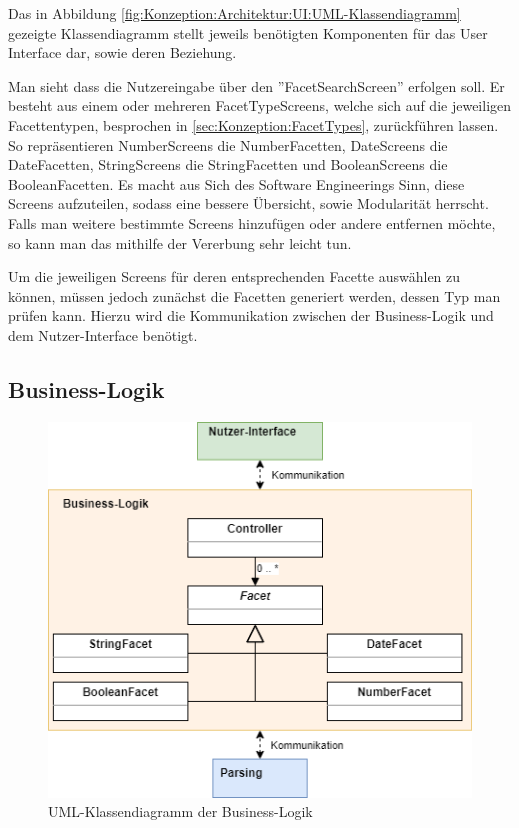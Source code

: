     Das in Abbildung \ref{fig:Konzeption:Architektur:UI:UML-Klassendiagramm} gezeigte Klassendiagramm stellt jeweils benötigten Komponenten für das User Interface dar, sowie deren Beziehung.

    Man sieht dass die Nutzereingabe über den ''FacetSearchScreen'' erfolgen soll.
    Er besteht aus einem oder mehreren FacetTypeScreens, welche sich auf die jeweiligen Facettentypen, besprochen in \ref{sec:Konzeption:FacetTypes}, zurückführen lassen.
    So repräsentieren NumberScreens die NumberFacetten, DateScreens die DateFacetten, StringScreens die StringFacetten und BooleanScreens die BooleanFacetten.
    Es macht aus Sich des Software Engineerings Sinn, diese Screens aufzuteilen, sodass eine bessere Übersicht, sowie Modularität herrscht.
    Falls man weitere bestimmte Screens hinzufügen oder andere entfernen möchte, so kann man das mithilfe der Vererbung sehr leicht tun.

    Um die jeweiligen Screens für deren entsprechenden Facette auswählen zu können, müssen jedoch zunächst die Facetten generiert werden, dessen Typ man prüfen kann.
    Hierzu wird die Kommunikation zwischen der Business-Logik und dem Nutzer-Interface benötigt.

    \subsection{Business-Logik}
    \label{subsec:Konzeption:Architektur:Business-Logik}

    \begin{figure}[th]
        \centering
        \includegraphics[width=.8\textwidth]{chapters/3_Konzeption/res/Architektur/class-diagramm_Business-Logik.png}
        \caption{UML-Klassendiagramm der Business-Logik}
        \label{fig:Konzeption:Architektur:Business-Logik:UML-Klassendiagramm}
    \end{figure}


